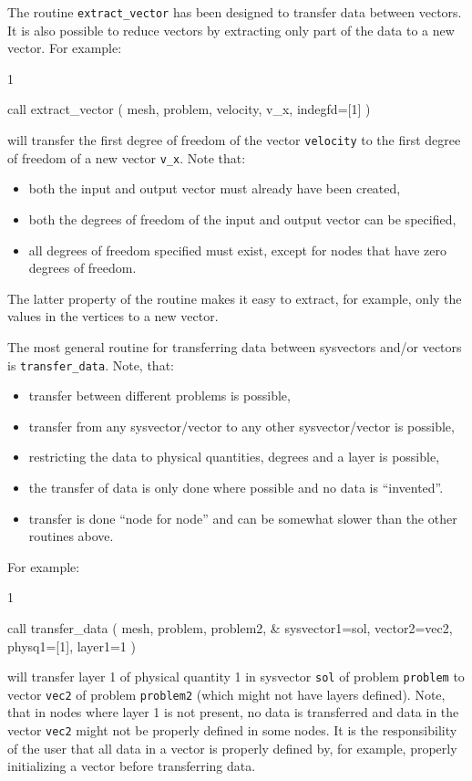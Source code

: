 The routine \texttt{extract\_vector} has been designed to transfer data between
vectors.
It is also possible to reduce vectors by extracting only part of the data to a
new vector. For example:
\begin{listing}{1}

  call extract_vector ( mesh, problem, velocity, v_x, indegfd=[1] )

\end{listing}
will transfer the first degree of freedom of the vector \texttt{velocity} to the
first degree of freedom of a new vector \texttt{v\_x}. Note that:
\begin{itemize}
   \item both the input and output vector must already have been created,
   \item both the degrees of freedom of the input and output vector can be
specified,
   \item all degrees of freedom specified must exist, except for nodes that
         have zero degrees of freedom.
\end{itemize}
The latter property of the routine makes it easy to extract, for example, only
the values in the vertices to a new vector.

The most general routine for transferring data between sysvectors and/or vectors
is \texttt{transfer\_data}. Note, that:
\begin{itemize}
   \item transfer between different problems is possible,
   \item transfer from any sysvector/vector to any other sysvector/vector is
possible,
   \item restricting the data to physical quantities, degrees and a layer is
possible,
   \item the transfer of data is only done where possible and no data is
``invented''. 
   \item transfer is done ``node for node'' and can be somewhat slower than the
other routines above.
\end{itemize}
For example:
\begin{listing}{1}

  call transfer_data ( mesh, problem, problem2, &
    sysvector1=sol, vector2=vec2, physq1=[1], layer1=1 )

\end{listing}
will transfer layer 1 of physical quantity 1 in sysvector \texttt{sol} of
problem \texttt{problem} to
vector \texttt{vec2} of problem \texttt{problem2} (which might not have layers
defined). Note, that in nodes where layer 1 is not present, no data is
transferred and data in the vector \texttt{vec2} might not be properly defined
in some nodes. It is the responsibility of the user that all data in a vector is
properly defined by, for example, properly initializing a vector before
transferring data.

